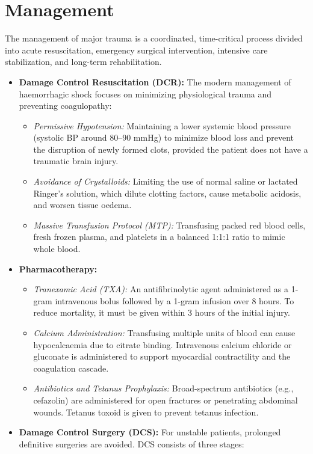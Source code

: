 \section*{Management}
The management of major trauma is a coordinated, time-critical process divided into acute resuscitation, emergency surgical intervention, intensive care stabilization, and long-term rehabilitation.
\begin{itemize}
    \item \textbf{Damage Control Resuscitation (DCR):} The modern management of haemorrhagic shock focuses on minimizing physiological trauma and preventing coagulopathy:
    \begin{itemize}
        \item \textit{Permissive Hypotension:} Maintaining a lower systemic blood pressure (systolic BP around 80--90 mmHg) to minimize blood loss and prevent the disruption of newly formed clots, provided the patient does not have a traumatic brain injury.
        \item \textit{Avoidance of Crystalloids:} Limiting the use of normal saline or lactated Ringer's solution, which dilute clotting factors, cause metabolic acidosis, and worsen tissue oedema.
        \item \textit{Massive Transfusion Protocol (MTP):} Transfusing packed red blood cells, fresh frozen plasma, and platelets in a balanced 1:1:1 ratio to mimic whole blood.
    \end{itemize}
    \item \textbf{Pharmacotherapy:}
    \begin{itemize}
        \item \textit{Tranexamic Acid (TXA):} An antifibrinolytic agent administered as a 1-gram intravenous bolus followed by a 1-gram infusion over 8 hours. To reduce mortality, it must be given within 3 hours of the initial injury.
        \item \textit{Calcium Administration:} Transfusing multiple units of blood can cause hypocalcaemia due to citrate binding. Intravenous calcium chloride or gluconate is administered to support myocardial contractility and the coagulation cascade.
        \item \textit{Antibiotics and Tetanus Prophylaxis:} Broad-spectrum antibiotics (e.g., cefazolin) are administered for open fractures or penetrating abdominal wounds. Tetanus toxoid is given to prevent tetanus infection.
    \end{itemize}
    \item \textbf{Damage Control Surgery (DCS):} For unstable patients, prolonged definitive surgeries are avoided. DCS consists of three stages:

\end{itemize}
